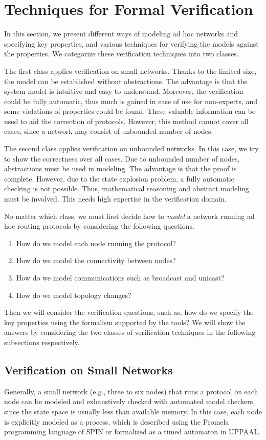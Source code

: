 \documentclass[a4paper,10pt,twocolumn]{article}
\begin{document}
\section{Techniques for Formal Verification}
\label{Sec:tech}
In this section, we present different ways of modeling ad hoc networks and specifying key properties, and various techniques for verifying the models against the properties. We categorize these verification techniques into two classes.

The first class applies verification on small networks. Thanks to the limited size, the model can be established without abstractions. The advantage is that the system model is intuitive and easy to understand. Moreover, the verification could be fully automatic, thus much is gained in ease of use for non-experts, and some violations of properties could be found. These valuable information can be used to aid the correction of protocols. However, this method cannot cover all cases, since a network may consist of unbounded number of nodes.

The second class applies verification on unbounded networks. In this case, we try to show the correctness over all cases. Due to unbounded number of nodes, abstractions must be used in modeling. The advantage is that the proof is complete. However, due to the state explosion problem, a fully automatic checking is not possible. Thus, mathematical reasoning and abstract modeling must be involved. This needs high expertise in the verification domain.

No matter which class, we must first decide how to \emph{model} a network running ad hoc routing protocols by considering the following questions.
\begin{enumerate}
  \item How do we model each node running the protocol?
  \item How do we model the connectivity between nodes?
  \item How do we model communications such as broadcast and unicast?
  \item How do we model topology changes?
\end{enumerate}
Then we will consider the verification questions, such as, how do we specify the key properties using the formalism supported by the tools? We will show the answers by considering the two classes of verification techniques in the following subsections respectively.

\subsection{Verification on Small Networks}
Generally, a small network (e.g., three to six nodes) that runs a protocol on each node can be modeled and exhaustively checked with automated model checkers, since the state space is usually less than available memory. In this case, each node is explicitly modeled as a process, which is described using the Promela programming language of SPIN or formalized as a timed automaton in UPPAAL.
\end{document}
